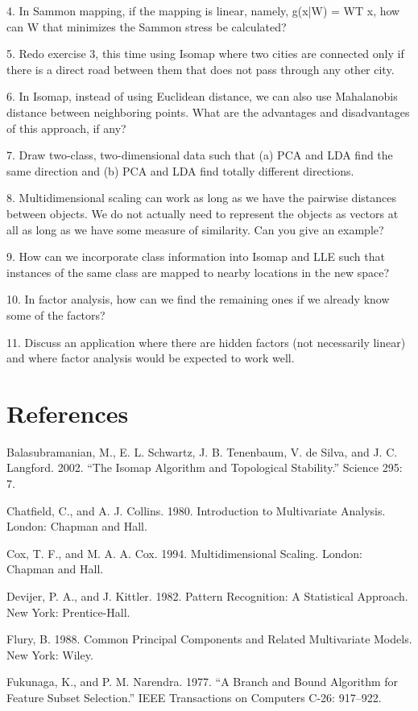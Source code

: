 4. In Sammon mapping, if the mapping is linear, namely, g(x|W) = WT x, how can W that minimizes the Sammon stress be calculated?

5. Redo exercise 3, this time using Isomap where two cities are connected only if there is a direct road between them that does not pass through any other city.

6. In Isomap, instead of using Euclidean distance, we can also use Mahalanobis distance between neighboring points. What are the advantages and disadvantages of this approach, if any?

7. Draw two-class, two-dimensional data such that (a) PCA and LDA find the same direction and (b) PCA and LDA find totally different directions.

8. Multidimensional scaling can work as long as we have the pairwise distances between objects. We do not actually need to represent the objects as vectors at all as long as we have some measure of similarity. Can you give an example?

9. How can we incorporate class information into Isomap and LLE such that instances of the same class are mapped to nearby locations in the new space?

10. In factor analysis, how can we find the remaining ones if we already know some of the factors?

11. Discuss an application where there are hidden factors (not necessarily linear) and where factor analysis would be expected to work well.

\section{References}

Balasubramanian, M., E. L. Schwartz, J. B. Tenenbaum, V. de Silva, and J. C. Langford. 2002. “The Isomap Algorithm and Topological Stability.” Science 295: 7.

Chatfield, C., and A. J. Collins. 1980. Introduction to Multivariate Analysis. London: Chapman and Hall.

Cox, T. F., and M. A. A. Cox. 1994. Multidimensional Scaling. London: Chapman and Hall.

Devijer, P. A., and J. Kittler. 1982. Pattern Recognition: A Statistical Approach. New York: Prentice-Hall.

Flury, B. 1988. Common Principal Components and Related Multivariate Models. New York: Wiley.

Fukunaga, K., and P. M. Narendra. 1977. “A Branch and Bound Algorithm for Feature Subset Selection.” IEEE Transactions on Computers C-26: 917--922.

